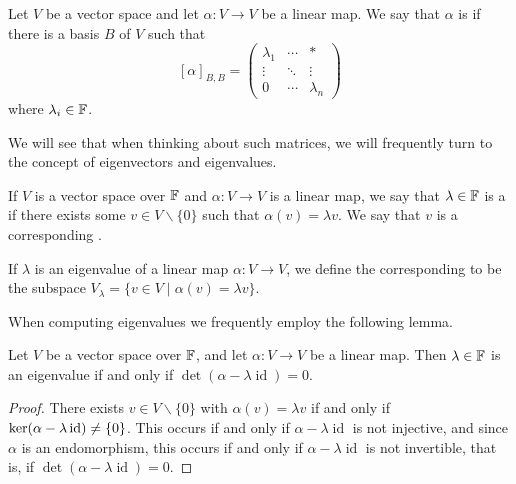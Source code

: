 \documentclass[a4paper]{scrartcl}
\begin{document}
\begin{definition}[Triangulable]    
    Let $V$ be a vector space and let $\alpha: V \rightarrow V$ be a linear map. We say that $\alpha$ is  if there is a basis $B$ of $V$ such that
    $$
    [\alpha]_{B, B} = \begin{pmatrix}
        \lambda_1 & \cdots & * \\
        \vdots & \ddots & \vdots \\
        0 & \cdots & \lambda_n
    \end{pmatrix}
    $$
    where $\lambda_i \in \mathbb{F}$. 
\end{definition}


We will see that when thinking about such matrices, we will frequently turn to the concept of eigenvectors and eigenvalues.

\begin{definition}
    If $V $ is a vector space over $\mathbb{F}$ and $\alpha: V \rightarrow V$ is a linear map, we say that $\lambda \in \mathbb{F}$ is a  if there exists some $v \in V \backslash\{0\}$ such that $\alpha(v) = \lambda v$. We say that $v$ is a corresponding .
\end{definition}

\begin{definition}[Eigenspace]
    If $\lambda$ is an eigenvalue of a linear map $\alpha: V \rightarrow V$, we define the corresponding  to be the subspace $V_\lambda = \{v \in V \mid \alpha(v) = \lambda v\}$.
\end{definition}

When computing eigenvalues we frequently employ the following lemma.

\begin{lemma}
    Let $V$ be a vector space over $\mathbb{F}$, and
    let $\alpha: V \rightarrow V$ be a linear map. Then $\lambda \in \mathbb{F}$ is an eigenvalue if and only if $\det(\alpha - \lambda \operatorname{id}) = 0$.
\end{lemma}
\begin{proof}
    There exists $v \in V \backslash\{0\}$ with $\alpha(v) = \lambda v$ if and only if $\operatorname{ker} (\alpha - \lambda \operatorname{id}) \neq \{0\}$. This occurs if and only if $\alpha - \lambda \operatorname{id}$ is not injective, and since $\alpha$ is an endomorphism, this occurs if and only if $\alpha - \lambda \operatorname{id}$ is not invertible, that is, if $\det(\alpha - \lambda \operatorname{id}) = 0$.
\end{proof}
\end{document}
